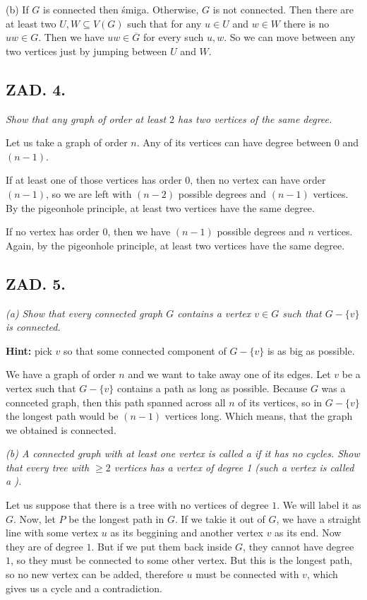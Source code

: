 \documentclass{article}[13pt]
\begin{document}
{\color{acc}(b)} If $G$ is connected then śmiga. Otherwise, $G$ is not connected. Then there are at least two $U, W\subseteq V(G)$ such that for any $u\in U$ and $w\in W$ there is no $uw\in G$. Then we have $uw\in \overline G$ for every such $u, w$. So we can move between any two vertices just by jumping between $U$ and $W$.

\subsection*{ZAD. 4.}

\emph{Show that any graph of order at least $2$ has two vertices of the same degree.}
\medskip

Let us take a graph of order $n$. Any of its vertices can have degree between $0$ and $(n-1)$. 
\smallskip

If at least one of those vertices has order $0$, then no vertex can have order $(n-1)$, so we are left with $(n-2)$ possible degrees and $(n-1)$ vertices. By the pigeonhole principle, at least two vertices have the same degree.
\smallskip

If no vertex has order $0$, then we have $(n-1)$ possible degrees and $n$ vertices. Again, by the pigeonhole principle, at least two vertices have the same degree.

\subsection*{ZAD. 5.}

\emph{{\color{def}(a)} Show that every connected graph $G$ contains a vertex $v\in G$ such that $G-\{v\}$ is connected.}

\textbf{Hint:} pick $v$ so that some connected component of $G-\{v\}$ is as big as possible.
\medskip

We have a graph of order $n$ and we want to take away one of its edges. Let $v$ be a vertex such that $G-\{v\}$ contains a path as long as possible. Because $G$ was a connceted graph, then this path spanned across all $n$ of its vertices, so in $G-\{v\}$ the longest path would be $(n-1)$ vertices long. Which means, that the graph we obtained is connected.
\medskip

\emph{{\color{def}(b)} A connected graph with at least one vertex is called a  if it has no cycles. Show that every tree with $\geq2$ vertices has a vertex of degree 1 (such a vertex is called a ).}
\medskip

Let us suppose that there is a tree with no vertices of degree $1$. We will label it as $G$. Now, let $P$ be the longest path in $G$. If we takie it out of $G$, we have a straight line with some vertex $u$ as its beggining and another vertex $v$ as its end. Now they are of degree $1$. But if we put them back inside $G$, they cannot have degree $1$, so they must be connected to some other vertex. But this is the longest path, so no new vertex can be added, therefore $u$ must be connected with $v$, which gives us a cycle and a contradiction.
\medskip
\end{document}
